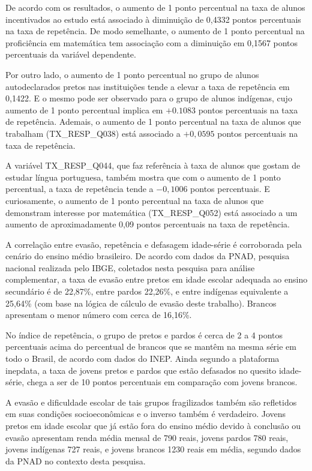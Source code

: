 \documentclass[english, spanish, brazilian]{RBIEarticle} %
\begin{document}
De acordo com os resultados, o aumento de 1 ponto percentual na taxa de alunos incentivados ao estudo está associado à diminuição de 0,4332 pontos percentuais na taxa de repetência. De modo semelhante, o aumento de 1 ponto percentual na proficiência em matemática tem associação com a diminuição em 0,1567 pontos percentuais da variável dependente.

Por outro lado, o aumento de 1 ponto percentual no grupo de alunos autodeclarados pretos nas instituições tende a elevar a taxa de repetência em 0,1422. E o mesmo pode ser observado para o grupo de alunos indígenas, cujo aumento de 1 ponto percentual implica em $+0.1083$ pontos percentuais na taxa de repetência. Ademais, o aumento de 1 ponto percentual na taxa de alunos que trabalham (TX\_RESP\_Q038) está associado a $+0,0595$ pontos percentuais na taxa de repetência.

A variável TX\_RESP\_Q044, que faz referência à taxa de alunos que gostam de estudar língua portuguesa, também mostra que com o aumento de 1 ponto percentual, a taxa de repetência tende a $-0,1006$ pontos percentuais. E curiosamente, o aumento de 1 ponto percentual na taxa de alunos que demonstram interesse por matemática (TX\_RESP\_Q052) está associado a um aumento de aproximadamente 0,09 pontos percentuais na taxa de repetência.

A correlação entre evasão, repetência e defasagem idade-série é corroborada pela cenário do ensino médio brasileiro. De acordo com dados da PNAD, pesquisa nacional realizada pelo IBGE, coletados nesta pesquisa para análise complementar, a taxa de evasão entre pretos em idade escolar adequada ao ensino secundário é de 22,87\%, entre pardos 22,26\%, e entre indígenas equivalente a 25,64\% (com base na lógica de cálculo de evasão deste trabalho). Brancos apresentam o menor número com cerca de 16,16\%. 

No índice de repetência, o grupo de pretos e pardos é cerca de 2 a 4 pontos percentuais acima do percentual de brancos que se mantêm na mesma série em todo o Brasil, de acordo com dados do INEP. Ainda segundo a plataforma inepdata, a taxa de jovens pretos e pardos que estão defasados no quesito idade-série, chega a ser de 10 pontos percentuais em comparação com jovens brancos.

A evasão e dificuldade escolar de tais grupos fragilizados também são refletidos em suas condições socioeconômicas e o inverso também é verdadeiro. Jovens pretos em idade escolar que já estão fora do ensino médio devido à conclusão ou evasão apresentam renda média mensal de 790 reais, jovens pardos 780 reais, jovens indígenas 727 reais, e jovens brancos 1230 reais em média, segundo dados da PNAD no contexto desta pesquisa.
\end{document}
